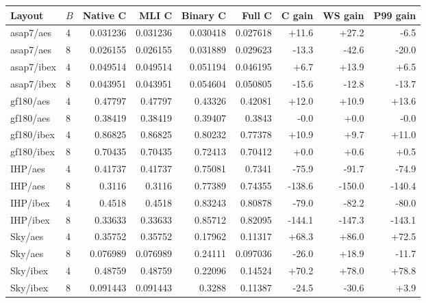 \begin{tabular}{llrrrrrrr}
\toprule
Layout & $B$ & Native C & MLI C & Binary C & Full C & C gain & WS gain & P99 gain \\
\midrule
asap7/aes & 4 & 0.031236 & 0.031236 & 0.030418 & 0.027618 & +11.6 & +27.2 & -6.5 \\
asap7/aes & 8 & 0.026155 & 0.026155 & 0.031889 & 0.029623 & -13.3 & -42.6 & -20.0 \\
asap7/ibex & 4 & 0.049514 & 0.049514 & 0.051194 & 0.046195 & +6.7 & +13.9 & +6.5 \\
asap7/ibex & 8 & 0.043951 & 0.043951 & 0.054604 & 0.050805 & -15.6 & -12.8 & -13.7 \\
gf180/aes & 4 & 0.47797 & 0.47797 & 0.43326 & 0.42081 & +12.0 & +10.9 & +13.6 \\
gf180/aes & 8 & 0.38419 & 0.38419 & 0.39407 & 0.3843 & -0.0 & +0.0 & -0.0 \\
gf180/ibex & 4 & 0.86825 & 0.86825 & 0.80232 & 0.77378 & +10.9 & +9.7 & +11.0 \\
gf180/ibex & 8 & 0.70435 & 0.70435 & 0.72413 & 0.70412 & +0.0 & +0.6 & +0.5 \\
IHP/aes & 4 & 0.41737 & 0.41737 & 0.75081 & 0.7341 & -75.9 & -91.7 & -74.9 \\
IHP/aes & 8 & 0.3116 & 0.3116 & 0.77389 & 0.74355 & -138.6 & -150.0 & -140.4 \\
IHP/ibex & 4 & 0.4518 & 0.4518 & 0.83243 & 0.80878 & -79.0 & -82.2 & -80.0 \\
IHP/ibex & 8 & 0.33633 & 0.33633 & 0.85712 & 0.82095 & -144.1 & -147.3 & -143.1 \\
Sky/aes & 4 & 0.35752 & 0.35752 & 0.17962 & 0.11317 & +68.3 & +86.0 & +72.5 \\
Sky/aes & 8 & 0.076989 & 0.076989 & 0.24111 & 0.097036 & -26.0 & +18.9 & -11.7 \\
Sky/ibex & 4 & 0.48759 & 0.48759 & 0.22096 & 0.14524 & +70.2 & +78.0 & +78.8 \\
Sky/ibex & 8 & 0.091443 & 0.091443 & 0.3288 & 0.11387 & -24.5 & -30.6 & +3.9 \\
\bottomrule
\end{tabular}
